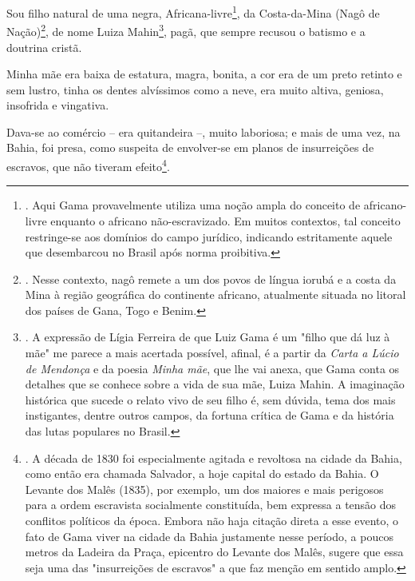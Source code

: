 Sou filho natural de uma negra, Africana-livre\footnote{. Aqui Gama
  provavelmente utiliza uma noção ampla do conceito de africano-livre
  enquanto o africano não-escravizado. Em muitos contextos, tal conceito
  restringe-se aos domínios do campo jurídico, indicando estritamente
  aquele que desembarcou no Brasil após norma proibitiva.}, da
Costa-da-Mina (Nagô de Nação)\footnote{. Nesse contexto, nagô remete a
  um dos povos de língua iorubá e a costa da Mina à região geográfica do
  continente africano, atualmente situada no litoral dos países de Gana,
  Togo e Benim.}, de nome Luiza Mahin\footnote{. A expressão de Lígia
  Ferreira de que Luiz Gama é um "filho que dá luz à mãe" me parece a
  mais acertada possível, afinal, é a partir da \emph{Carta a Lúcio de
  Mendonça} e da poesia \emph{Minha mãe}, que lhe vai anexa, que Gama
  conta os detalhes que se conhece sobre a vida de sua mãe, Luiza Mahin.
  A imaginação histórica que sucede o relato vivo de seu filho é, sem
  dúvida, tema dos mais instigantes, dentre outros campos, da fortuna
  crítica de Gama e da história das lutas populares no Brasil.}, pagã,
que sempre recusou o batismo e a doutrina cristã.

Minha mãe era baixa de estatura, magra, bonita, a cor era de um preto
retinto e sem lustro, tinha os dentes alvíssimos como a neve, era muito
altiva, geniosa, insofrida e vingativa.

Dava-se ao comércio -- era quitandeira --, muito laboriosa; e mais de
uma vez, na Bahia, foi presa, como suspeita de envolver-se em planos de
insurreições de escravos, que não tiveram efeito\footnote{. A década de
  1830 foi especialmente agitada e revoltosa na cidade da Bahia, como
  então era chamada Salvador, a hoje capital do estado da Bahia. O
  Levante dos Malês (1835), por exemplo, um dos maiores e mais perigosos
  para a ordem escravista socialmente constituída, bem expressa a tensão
  dos conflitos políticos da época. Embora não haja citação direta a
  esse evento, o fato de Gama viver na cidade da Bahia justamente nesse
  período, a poucos metros da Ladeira da Praça, epicentro do Levante dos
  Malês, sugere que essa seja uma das "insurreições de escravos" a que
  faz menção em sentido amplo.}.

